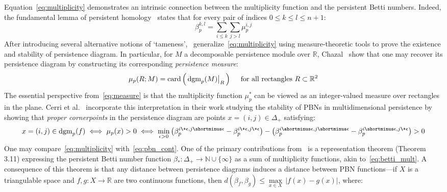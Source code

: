 Equation~\eqref{eq:multiplicity} demonstrates an intrinsic connection between the multiplicity function and the persistent Betti numbers. Indeed, the fundamental lemma of persistent homology~\cite{edelsbrunner2022computational} states that for every pair of indices $0 \leq k \leq l \leq n+1$: 
\begin{equation}\label{eq:betti_mult}
	\beta_p^{k,l} = \sum\limits_{i \leq k} \sum\limits_{j > l} \mu_p^{i,j}
\end{equation}
After introducing several alternative notions of `tameness',~\cite{chazal2016structure} generalize~\eqref{eq:multiplicity} using measure-theoretic tools to prove the existence and stability of persistence diagram. In particular, for $M$ a decomposable persistence module over $\mathbb{R}$, Chazal~\cite{chazal2016structure} show that one may recover its persistence diagram by constructing its corresponding \emph{persistence measure}:
\begin{equation}\label{eq:measure}
	\mu_p(R; M) = \mathrm{card}\left( \,
	\restr{\mathrm{dgm}_p(M)}{R} \,
	\right) \quad \text{ for all rectangles } R \subset \mathbb{R}^2 
\end{equation}
The essential perspective from~\eqref{eq:measure} is that the multiplicity function $\mu^\ast_p$ can be viewed as an integer-valued measure over rectangles in the plane. 
Cerri et al.~\cite{cerri2013betti} incorporate this interpretation in their work studying the stability of PBNs in multidimensional persistence by showing that \emph{proper cornerpoints} in the persistence diagram are points $x = (i,j) \in \Delta_+$ satisfying:
\begin{equation}\label{eq:pbn_cont}
	x = (i,j) \in \mathrm{dgm}_p(f) \; \Longleftrightarrow \; \mu_p(x) > 0 \; \Longleftrightarrow \; \min_{\epsilon > 0} \left(\beta_p^{i \+ \epsilon, j \shortminus \epsilon} - \beta_p^{i \+ \epsilon, j \+ \epsilon} \right) - \left(\beta_p^{i \shortminus \epsilon, j \shortminus \epsilon} - \beta_p^{i \shortminus \epsilon, j \+ \epsilon} \right) > 0
\end{equation}
One may compare~\eqref{eq:multiplicity} with~\eqref{eq:pbn_cont}. One of the primary contributions from~\cite{cerri2013betti} is a representation theorem (Theorem 3.11) expressing the persistent Betti number function $\beta_\ast : \Delta_+ \to \mathbb{N}\cup \{\infty\}$ as a sum of multiplicity functions, akin to~\eqref{eq:betti_mult}. 
A consequence of this theorem is that any distance between persistence diagrams induces a distance between PBN functions---if $X$ is a triangulable space and $f,g : X \to \mathbb{R}$ are two continuous functions, then $d(\beta_f, \beta_g) \leq \max\limits_{x \in X} \, \lvert f(x) - g(x) \rvert$, where:
